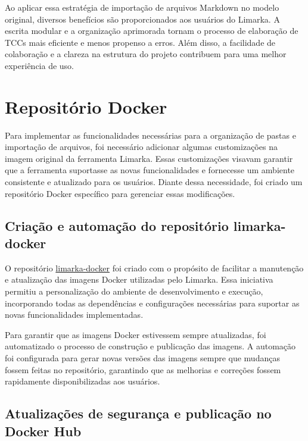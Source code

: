 \documentclass[
	12pt,				%
	oneside,			%
	a4paper,			%
	english,			%
	french,				%
	spanish,			%
	brazil				%
	]{abntex2}
\begin{document}
Ao aplicar essa estratégia de importação de arquivos Markdown no modelo
original, diversos benefícios são proporcionados aos usuários do
Limarka. A escrita modular e a organização aprimorada tornam o processo
de elaboração de TCCs mais eficiente e menos propenso a erros. Além
disso, a facilidade de colaboração e a clareza na estrutura do projeto
contribuem para uma melhor experiência de uso.

\hypertarget{reposituxf3rio-docker}{%
\section{Repositório Docker}\label{reposituxf3rio-docker}}

Para implementar as funcionalidades necessárias para a organização de
pastas e importação de arquivos, foi necessário adicionar algumas
customizações na imagem original da ferramenta Limarka. Essas
customizações visavam garantir que a ferramenta suportasse as novas
funcionalidades e fornecesse um ambiente consistente e atualizado para
os usuários. Diante dessa necessidade, foi criado um repositório Docker
específico para gerenciar essas modificações.

\hypertarget{criauxe7uxe3o-e-automauxe7uxe3o-do-reposituxf3rio-limarka-docker}{%
\subsection{Criação e automação do repositório
limarka-docker}\label{criauxe7uxe3o-e-automauxe7uxe3o-do-reposituxf3rio-limarka-docker}}

O repositório
\href{https://github.com/ReinanHS/limarka-docker}{limarka-docker} foi
criado com o propósito de facilitar a manutenção e atualização das
imagens Docker utilizadas pelo Limarka. Essa iniciativa permitiu a
personalização do ambiente de desenvolvimento e execução, incorporando
todas as dependências e configurações necessárias para suportar as novas
funcionalidades implementadas.

Para garantir que as imagens Docker estivessem sempre atualizadas, foi
automatizado o processo de construção e publicação das imagens. A
automação foi configurada para gerar novas versões das imagens sempre
que mudanças fossem feitas no repositório, garantindo que as melhorias e
correções fossem rapidamente disponibilizadas aos usuários.

\hypertarget{atualizauxe7uxf5es-de-seguranuxe7a-e-publicauxe7uxe3o-no-docker-hub}{%
\subsection{Atualizações de segurança e publicação no Docker
Hub}\label{atualizauxe7uxf5es-de-seguranuxe7a-e-publicauxe7uxe3o-no-docker-hub}}
\end{document}
